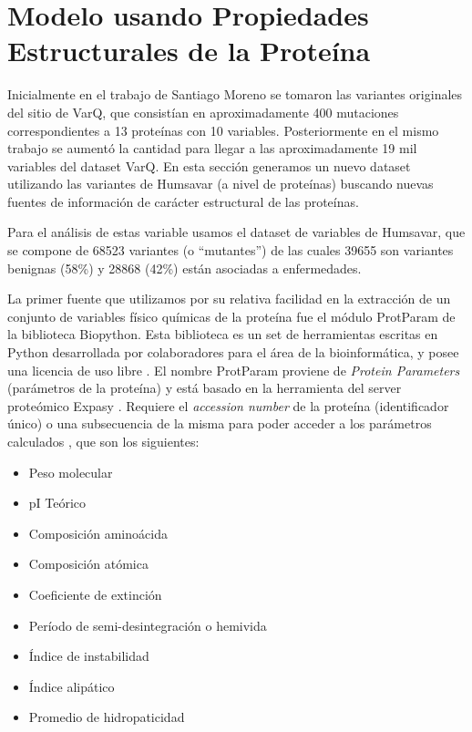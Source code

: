 \section{Modelo usando Propiedades Estructurales de la Proteína}

Inicialmente en el trabajo de Santiago Moreno se tomaron las variantes originales del sitio de VarQ, que consistían en aproximadamente 400 mutaciones correspondientes a 13 proteínas con 10 variables. Posteriormente en el mismo trabajo se aumentó la cantidad para llegar a las aproximadamente 19 mil variables del dataset VarQ. En esta sección generamos un nuevo dataset utilizando las variantes de Humsavar (a nivel de proteínas) buscando nuevas fuentes de información de carácter estructural de las proteínas.

Para el análisis de estas variable usamos el dataset de variables de Humsavar, que se compone de 68523 variantes (o ``mutantes'') de las cuales 39655 son variantes benignas (58\%) y 28868 (42\%) están asociadas a enfermedades. 

La primer fuente que utilizamos por su relativa facilidad en la extracción de un conjunto de variables físico químicas de la proteína fue el módulo ProtParam de la biblioteca Biopython. Esta biblioteca es un set de herramientas escritas en Python desarrollada por colaboradores para el área de la bioinformática, y posee una licencia de uso libre \todo{[citar]}.
El nombre ProtParam proviene de \textit{Protein Parameters} (parámetros de la proteína) y está basado en la herramienta del server proteómico Expasy \todo{[citar]}. Requiere el \textit{accession number} de la proteína (identificador único) o una subsecuencia de la misma para poder acceder a los parámetros calculados \todo{[citar]}, que son los siguientes:

\begin{itemize}
    \item Peso molecular
    \item pI Teórico
    \item Composición aminoácida
    \item Composición atómica
    \item Coeficiente de extinción
    \item Período de semi-desintegración o hemivida
    \item Índice de instabilidad
    \item Índice alipático
    \item Promedio de hidropaticidad
\end{itemize}

